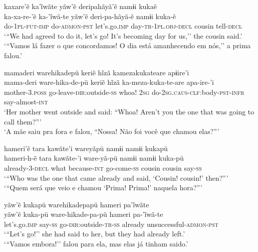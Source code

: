 \documentclass[output=paper,
modfonts,nonflat
]{langsci/langscibook}
\begin{document}
\ea   kaxare'ẽ ka'ĩwãte yãw'ẽ deripahãyã'ẽ namɨi kukaẽ \\[.3em]
\gll 	ka-xa-re-'ẽ ka-'ĩwã-te yãw'ẽ deri-pa-hãyã-ẽ namɨi kuka-ẽ\\
do-\textsc{1pl-fut-imp} do\textsc{-admon-pst}  let's.go.\textsc{imp} day-\textsc{tr}-\textsc{1pl.obj-decl} cousin tell-\textsc{decl}\\
\glt    `{``}We had agreed to do it, let's go! It's becoming day for us,'' the cousin said.' \\
`{``}Vamos lá fazer o que concordamos! O dia está amanhecendo em nós,'' a prima falou.' \\
\z

\ea   mamaderi warehikadepü keriẽ hĩzã kamezakukateare apɨire'i \\[.3em]
\gll 	mama-deri ware-hika-de-pü keriẽ hĩzã ka-meza-kuka-te-are apa-ire-'i \\
mother-\textsc{3.poss} go-leave-\textsc{dir}:outside-\textsc{ss}  whoa! \textsc{2sg} do-\textsc{2sg.caus}-\textsc{clf}:body-\textsc{pst}-\textsc{infr} say-almost-\textsc{int} \\
\glt   `Her mother went outside and said: ``Whoa! Aren't you the one that was going to call them?{''}' \\
`A mãe saiu pra fora e falou, ``Nossa! Não foi você que chamou elas?{''}'\\
\z

\ea   hameri'ẽ  tara kawãte'i wareyãpü namɨi namɨi kukapü \\[.3em]
\gll 	hameri-h-ẽ  tara kawãte-'i ware-yã-pü namɨi namɨi kuka-pü\\
already-\textsc{3-decl} what because-\textsc{int} go-come-\textsc{ss} cousin cousin say-\textsc{ss} \\
\glt    `{``}Who was the one that came already and said, `Cousin! cousin!' then?{''}'\\
`{``}Quem será que veio e chamou `Prima! Prima!' naquela hora?{''}'
%
\z

 
\ea   yãw'ẽ kukapü warehikadepapü hameri pa'ĩwãte \\[.3em]
\gll 	yãw'ẽ kuka-pü ware-hikade-pa-pü hameri pa-'ĩwã-te\\
let's.go.\textsc{imp} say-\textsc{ss} go-\textsc{dir}:outside-\textsc{tr-ss} already  unsuccessful-\textsc{admon-pst}\\
\glt   `{``}Let's go!'' she had said to her, but they had already left.'\\
 `{``}Vamos embora!'' falou para ela, mas elas já tinham saido.'\\
\z
\end{document}

